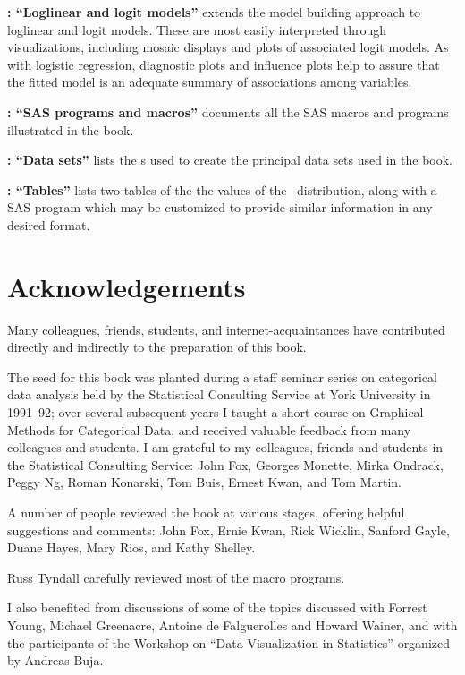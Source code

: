 \textbf{: ``Loglinear and logit models''}
extends the model building approach to loglinear and logit models.
These are most easily interpreted through
visualizations, including mosaic displays and plots of associated
logit models.  As with logistic regression, diagnostic plots
and influence plots help to assure that the fitted model is
an adequate summary of associations among variables.

\textbf{: ``SAS programs and macros''}
documents all the SAS macros and programs
illustrated in the book.

\textbf{: ``Data sets''}
lists the \Dstp{}s used to create the
principal data sets used in the book.

\textbf{: ``Tables''}
lists two tables of the the values of the \chisq\ distribution,
along with a SAS program which may be customized to provide
similar information in any desired format.

\section*{Acknowledgements}
Many colleagues, friends, students, and internet-acquaintances have contributed
directly and indirectly to the preparation of this book.

The seed for this book was planted during a staff seminar series
on categorical data analysis held by the Statistical Consulting
Service at York University in 1991--92;
over several subsequent years I taught a short course on
Graphical Methods for Categorical Data, and received valuable feedback
from many colleagues and students.
I am grateful to my colleagues, friends and students
in the Statistical Consulting Service:
John Fox,
Georges Monette,
Mirka Ondrack,
Peggy Ng,
Roman Konarski,
Tom Buis,
Ernest Kwan, and
Tom Martin.

A number of people reviewed the book at various stages, offering helpful suggestions
and comments: John Fox, Ernie Kwan, Rick Wicklin,
Sanford Gayle,
Duane Hayes,
Mary Rios, and
Kathy Shelley.
\begin{changebar}
Russ Tyndall carefully reviewed most of the macro programs.
\end{changebar}
I also benefited from discussions of some of the topics discussed
with Forrest Young, Michael Greenacre, Antoine de Falguerolles and 
Howard Wainer, and with the participants of the Workshop on ``Data Visualization in Statistics'' organized by Andreas Buja.

